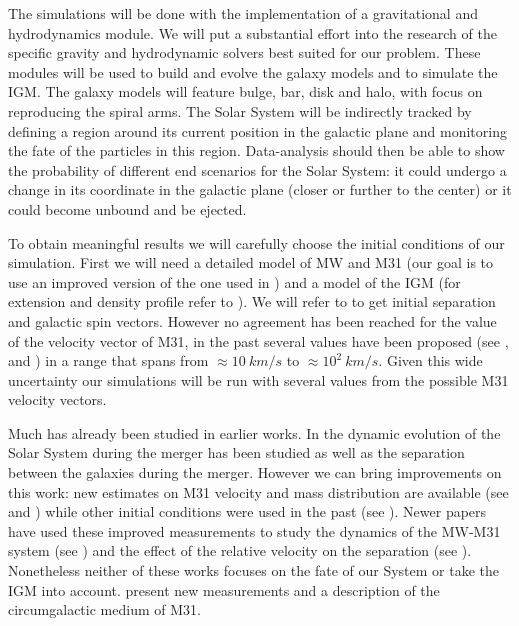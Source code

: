 \documentclass[10pt,english]{article}
\begin{document}
The simulations will be done with the implementation of a gravitational and hydrodynamics module. We will put a substantial effort into the research of the specific gravity and hydrodynamic solvers best suited for our problem. These modules will be used to build and evolve the galaxy models and to simulate the IGM. The galaxy models will feature bulge, bar, disk and halo, with focus on reproducing the spiral arms. The Solar System will be indirectly tracked by defining a region around its current position in the galactic plane and monitoring the fate of the particles in this region. Data-analysis should then be able to show the probability of different end scenarios for the Solar System: it could undergo a change in its coordinate in the galactic plane (closer or further to the center) or it could become unbound and be ejected.\par
\smallskip
To obtain meaningful results we will carefully choose the initial conditions of our simulation. First we will need a detailed model of MW and M31 (our goal is to use an improved version of the one used in \textcite{Cox_2008}) and a model of the IGM (for extension and density profile refer to \textcite{Lehner_2020}). We will refer to \textcite{Raychaudhury_1989} to get initial separation and galactic spin vectors. However no agreement has been reached for the value of the velocity vector of M31, in the past several values have been proposed (see \textcite{van_der_Marel_2012b}, \textcite{Salomon_2016} and \textcite{van_der_Marel_2019}) in a range that spans from \(\approx 10\: km/s\) to \(\approx 10^2\: km/s\). Given this wide uncertainty our simulations will be run with several values from the possible M31 velocity vectors.\par
\smallskip
Much has already been studied in earlier works. In \textcite{Cox_2008} the dynamic evolution of the Solar System during the merger has been studied as well as the separation between the galaxies during the merger. However we can bring improvements on this work: new estimates on M31 velocity and mass distribution are available (see \textcite{Sohn_2012} and \textcite{van_der_Marel_2012}) while other initial conditions were used in the past (see \textcite{Klypin_2002}). Newer papers have used these improved measurements to study the dynamics of the MW-M31 system (see \textcite{van_der_Marel_2012b}) and the effect of the relative velocity on the separation (see \textcite{Schiavi_2019}). Nonetheless neither of these works focuses on the fate of our System or take the IGM into account. \textcite{Lehner_2020} present new measurements and a description of the circumgalactic medium of M31.\par
\end{document}
